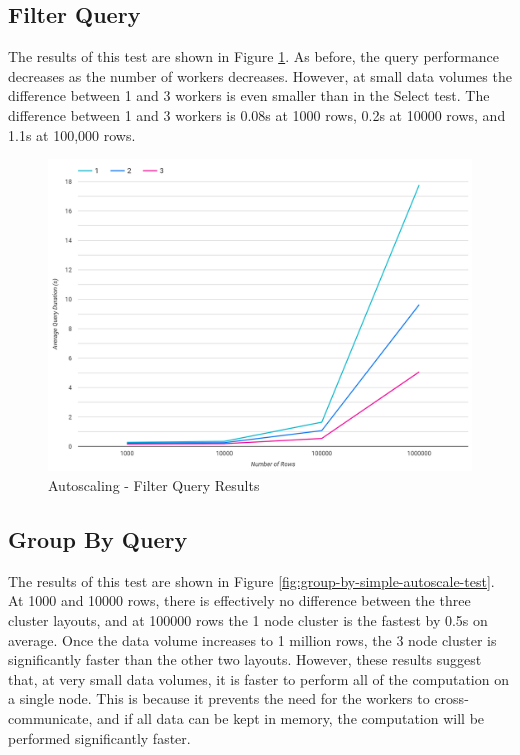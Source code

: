 \subsection{Filter Query}
The results of this test are shown in Figure \ref{fig:filter-simple-autoscale-test}. As before, the query performance decreases as the number of workers decreases. However, at small data volumes the difference between 1 and 3 workers is even smaller than in the Select test. The difference between 1 and 3 workers is 0.08s at 1000 rows, 0.2s at 10000 rows, and 1.1s at 100,000 rows.

\begin{figure}[h]
	\centering
	\includegraphics[width=0.8\linewidth]{chapters/diagrams/testing/filter-simple-autoscale-test}
	\caption{Autoscaling - Filter Query Results}
	\label{fig:filter-simple-autoscale-test}
\end{figure}

\subsection{Group By Query}
The results of this test are shown in Figure \ref{fig:group-by-simple-autoscale-test}. At 1000 and 10000 rows, there is effectively no difference between the three cluster layouts, and at 100000 rows the 1 node cluster is the fastest by 0.5s on average. Once the data volume increases to 1 million rows, the 3 node cluster is significantly faster than the other two layouts. However, these results suggest that, at very small data volumes, it is faster to perform all of the computation on a single node. This is because it prevents the need for the workers to cross-communicate, and if all data can be kept in memory, the computation will be performed significantly faster.

